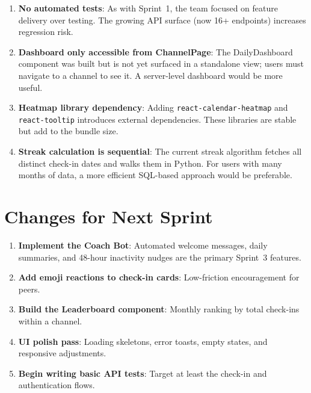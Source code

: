 \documentclass[11pt]{article}
\begin{document}
\begin{enumerate}[leftmargin=1.5em]
    \item \textbf{No automated tests}: As with Sprint~1, the team focused on feature delivery over testing. The growing API surface (now 16+ endpoints) increases regression risk.

    \item \textbf{Dashboard only accessible from ChannelPage}: The DailyDashboard component was built but is not yet surfaced in a standalone view; users must navigate to a channel to see it. A server-level dashboard would be more useful.

    \item \textbf{Heatmap library dependency}: Adding \texttt{react-calendar-heatmap} and \texttt{react-tooltip} introduces external dependencies. These libraries are stable but add to the bundle size.

    \item \textbf{Streak calculation is sequential}: The current streak algorithm fetches all distinct check-in dates and walks them in Python. For users with many months of data, a more efficient SQL-based approach would be preferable.
\end{enumerate}

\section{Changes for Next Sprint}

\begin{enumerate}[leftmargin=1.5em]
    \item \textbf{Implement the Coach Bot}: Automated welcome messages, daily summaries, and 48-hour inactivity nudges are the primary Sprint~3 features.

    \item \textbf{Add emoji reactions to check-in cards}: Low-friction encouragement for peers.

    \item \textbf{Build the Leaderboard component}: Monthly ranking by total check-ins within a channel.

    \item \textbf{UI polish pass}: Loading skeletons, error toasts, empty states, and responsive adjustments.

    \item \textbf{Begin writing basic API tests}: Target at least the check-in and authentication flows.
\end{enumerate}
\end{document}

